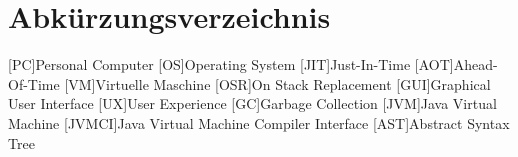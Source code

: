 \chapter*{Abkürzungsverzeichnis}
\begin{acronym}
    [PC]{Personal Computer}
    [OS]{Operating System}
    [JIT]{Just-In-Time}
    [AOT]{Ahead-Of-Time}
    [VM]{Virtuelle Maschine}
    [OSR]{On Stack Replacement}
    [GUI]{Graphical User Interface}
    [UX]{User Experience}
    [GC]{Garbage Collection}
    [JVM]{Java Virtual Machine}
    [JVMCI]{Java Virtual Machine Compiler Interface}    
    [AST]{Abstract Syntax Tree}
\end{acronym}